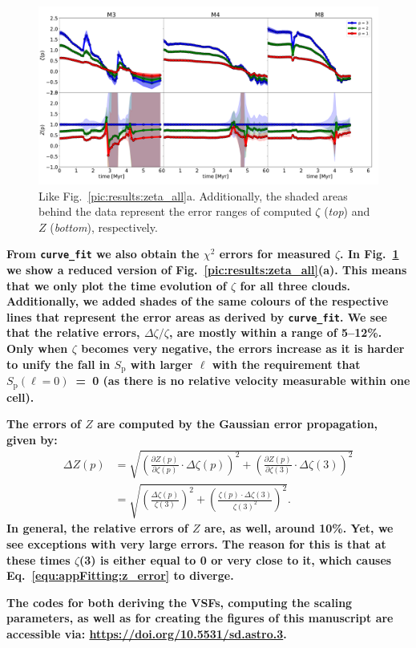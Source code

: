 \begin{figure}
    \centering
    \includegraphics[width=\textwidth]{error_vsf04_zeta_z.pdf}
    \caption{
        Like Fig.~\ref{pic:results:zeta_all}a.
        Additionally, the shaded areas behind the data represent the error ranges of computed $\zeta$ (\textit{top}) and $Z$ (\textit{bottom}), respectively. 
    }
    \label{pic:appFitting:error_vsfhr04_zeta_z}
\end{figure}


\textbf{
    From \texttt{curve\_fit} we also obtain the $\chi^2$ errors for measured $\zeta$. 
    In Fig.~\ref{pic:appFitting:error_vsfhr04_zeta_z} we show a reduced version of Fig.~\ref{pic:results:zeta_all}(a).
    This means that we only plot the time evolution of $\zeta$ for all three clouds.
    Additionally, we added shades of the same colours of the respective lines that represent the error areas as derived by \texttt{curve\_fit}.
    We see that the relative errors, $\Delta \zeta / \zeta$, are mostly within a range of 5--12\%. 
    Only when $\zeta$ becomes very negative, the errors increase as it is harder to unify the fall in $S_\mathrm{p}$ with larger $\ell$ with the requirement that $S_\mathrm{p} (\ell=0)$~=~0 (as there is no relative velocity measurable within one cell).
}

\textbf{
    The errors of $Z$ are computed by the Gaussian error propagation, given by:
}
\begin{align}\Delta Z(p) &= \sqrt{ \left( \frac{\partial Z(p)}{\partial \zeta(p)} \cdot \Delta\zeta(p) \right)^2 + \left( \frac{\partial Z(p)}{\partial \zeta(3)} \cdot \Delta\zeta(3) \right)^2 } \\
        &= \sqrt{ \left( \frac{\Delta\zeta(p)}{\zeta(3)} \right)^2 + \left( \frac{ \zeta(p) \cdot \Delta\zeta(3)}{\zeta(3)^2} \right)^2 }.
        \label{equ:appFitting:z_error}
\end{align}
\textbf{
    \noindent In general, the relative errors of $Z$ are, as well, around 10\%.
    Yet, we see exceptions with very large errors. 
    The reason for this is that at these times $\zeta$(3) is either equal to 0 or very close to it, which causes Eq.~\ref{equ:appFitting:z_error} to diverge.
}

\textbf{
    The codes for both deriving the VSFs, computing the scaling parameters, as well as for creating the figures of this manuscript are accessible via: \newline
    {\url{https://doi.org/10.5531/sd.astro.3}}.
}


\endinput
